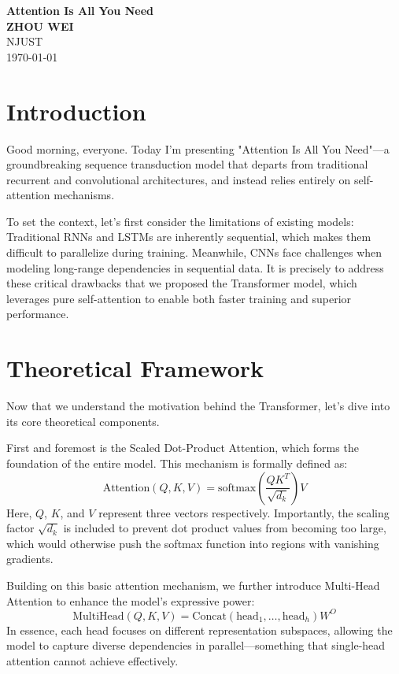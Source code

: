 \documentclass[12pt,a4paper]{article}
\begin{document}
\begin{center}
    \textbf{\LARGE Attention Is All You Need} \\
    \vspace{0.5cm}
    \textbf{\large ZHOU WEI} \\
    \vspace{0.2cm}
    NJUST \\
    \vspace{0.2cm}
    \today
\end{center}

\vspace{1cm}

\section*{Introduction}
Good morning, everyone. Today I'm presenting "Attention Is All You Need"—a groundbreaking sequence transduction model that departs from traditional recurrent and convolutional architectures, and instead relies entirely on self-attention mechanisms. 

To set the context, let's first consider the limitations of existing models: Traditional RNNs and LSTMs are inherently sequential, which makes them difficult to parallelize during training. Meanwhile, CNNs face challenges when modeling long-range dependencies in sequential data. It is precisely to address these critical drawbacks that we proposed the Transformer model, which leverages pure self-attention to enable both faster training and superior performance.

\section*{Theoretical Framework}
Now that we understand the motivation behind the Transformer, let's dive into its core theoretical components. 

First and foremost is the Scaled Dot-Product Attention, which forms the foundation of the entire model. This mechanism is formally defined as:
\[
\text{Attention}(Q, K, V) = \text{softmax}\left(\frac{QK^T}{\sqrt{d_k}}\right)V
\]
Here, $Q$, $K$, and $V$ represent three vectors respectively. Importantly, the scaling factor $\sqrt{d_k}$ is included to prevent dot product values from becoming too large, which would otherwise push the softmax function into regions with vanishing gradients.

Building on this basic attention mechanism, we further introduce Multi-Head Attention to enhance the model's expressive power:
\[
\text{MultiHead}(Q, K, V) = \text{Concat}(\text{head}_1, \dots, \text{head}_h)W^O
\]
In essence, each head focuses on different representation subspaces, allowing the model to capture diverse dependencies in parallel—something that single-head attention cannot achieve effectively.
\end{document}
